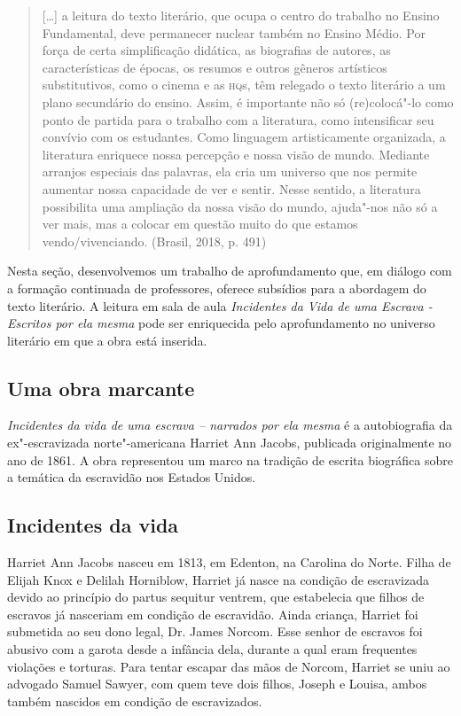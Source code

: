 \documentclass[12pt]{extarticle}
\begin{document}
\begin{quote}
{[}\ldots{}{]} a leitura do texto literário, que ocupa o centro do trabalho
no Ensino Fundamental, deve permanecer nuclear também no Ensino Médio.
Por força de certa simplificação didática, as biografias de autores, as
características de épocas, os resumos e outros gêneros artísticos
substitutivos, como o cinema e as \textsc{hq}s, têm relegado o texto literário a
um plano secundário do ensino. Assim, é importante não só (re)colocá"-lo
como ponto de partida para o trabalho com a literatura, como
intensificar seu convívio com os estudantes. Como linguagem
artisticamente organizada, a literatura enriquece nossa percepção e
nossa visão de mundo. Mediante arranjos especiais das palavras, ela cria
um universo que nos permite aumentar nossa capacidade de ver e sentir.
Nesse sentido, a literatura possibilita uma ampliação da nossa visão do
mundo, ajuda"-nos não só a ver mais, mas a colocar em questão muito do
que estamos vendo/vivenciando. (Brasil, 2018, p. 491)
\end{quote}

Nesta seção, desenvolvemos um trabalho de aprofundamento que, em diálogo
com a formação continuada de professores, oferece subsídios para a
abordagem do texto literário. A leitura em sala de aula \emph{Incidentes
da Vida de uma Escrava - Escritos por ela mesma} pode ser enriquecida
pelo aprofundamento no universo literário em que a obra está inserida.

\subsection{Uma obra marcante}

\emph{Incidentes da vida de uma escrava -- narrados por ela mesma} é a
autobiografia da ex"-escravizada norte"-americana Harriet Ann Jacobs,
publicada originalmente no ano de 1861. A obra representou um marco na
tradição de escrita biográfica sobre a temática da escravidão nos
Estados Unidos.




\subsection{Incidentes da vida}

Harriet Ann Jacobs nasceu em 1813, em Edenton, na Carolina do
Norte. Filha de Elijah Knox e Delilah Horniblow, Harriet já nasce na
condição de escravizada devido ao princípio do partus sequitur ventrem,
que estabelecia que filhos de escravos já nasceriam em condição de
escravidão. Ainda criança, Harriet foi submetida ao seu dono legal, Dr.
James Norcom. Esse senhor de escravos foi abusivo com a garota desde a
infância dela, durante a qual eram frequentes violações e torturas. Para
tentar escapar das mãos de Norcom, Harriet se uniu ao advogado Samuel
Sawyer, com quem teve dois filhos, Joseph e Louisa, ambos também
nascidos em condição de escravizados.
\end{document}

